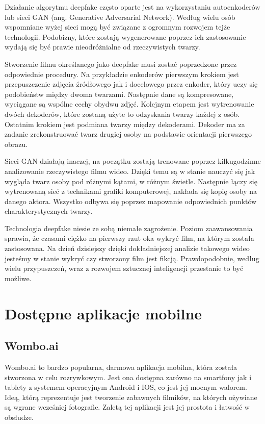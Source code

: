 Działanie algorytmu deepfake często oparte jest na wykorzystaniu autoenkoderów lub sieci GAN (ang. Generative Adversarial Network). Według wielu osób wspomniane wyżej sieci mogą być związane z ogromnym rozwojem tejże technologii. Podobizny, które zostają wygenerowane poprzez ich zastosowanie wydają się być prawie nieodróżnialne od rzeczywistych twarzy. \cite{deepfake}

Stworzenie filmu określanego jako deepfake musi zostać poprzedzone przez odpowiednie procedury. Na przykładzie enkoderów pierwszym krokiem jest przepuszczenie zdjęcia źródłowego jak i docelowego przez enkoder, który uczy się podobieństw między dwoma twarzami. Następnie dane są kompresowane, wyciągane są wspólne cechy obydwu zdjęć. Kolejnym etapem jest wytrenowanie dwóch dekoderów, które zostaną użyte to odzyskania twarzy każdej z osób. Ostatnim krokiem jest podmiana twarzy między dekoderami. Dekoder ma za zadanie zrekonstruować twarz drugiej osoby na podstawie orientacji pierwszego obrazu. 

Sieci GAN działają inaczej, na początku zostają trenowane poprzez kilkugodzinne analizowanie rzeczywistego filmu wideo. Dzięki temu są w stanie nauczyć się jak wygląda twarz osoby pod różnymi kątami, w różnym świetle. Następnie łączy się wytrenowaną sieć z technikami grafiki komputerowej, nakłada się kopię osoby na danego aktora. Wszystko odbywa się poprzez mapowanie odpowiednich punktów charakterystycznych twarzy.

Technologia deepfake niesie ze sobą niemałe zagrożenie. Poziom zaawansowania sprawia, że czasami ciężko na pierwszy rzut oka wykryć film, na którym została zastosowana. Na dzień dzisiejszy dzięki dokładniejszej analizie takowego wideo jesteśmy w stanie wykryć czy stworzony film jest fikcją. Prawdopodobnie, według wielu przypuszczeń, wraz z rozwojem sztucznej inteligencji przestanie to być możliwe.


\section{Dostępne aplikacje mobilne}

\subsection{Wombo.ai}
Wombo.ai \cite{womboai} to bardzo popularna, darmowa aplikacja mobilna, która została stworzona w celu rozrywkowym. Jest ona dostępna zarówno na smartfony jak i tablety z systemem operacyjnym Android i IOS, co jest jej mocnym walorem. Ideą, którą reprezentuje jest tworzenie zabawnych filmików, na których ożywiane są wgrane wcześniej fotografie. Zaletą tej aplikacji jest jej prostota i łatwość w obsłudze. 

